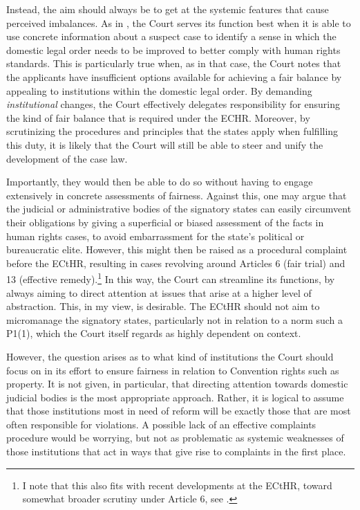 Instead, the aim should always be to get at the systemic features that cause perceived imbalances. As in \textcite{hutten06}, the Court serves its function best when it is able to use concrete information about a suspect case to identify a sense in which the domestic legal order needs to be improved to better comply with human rights standards. This is particularly true when, as in that case, the Court notes that the applicants have insufficient options available for achieving a fair balance by appealing to institutions within the domestic legal order. By demanding {\it institutional} changes, the Court effectively delegates responsibility for ensuring the kind of fair balance that is required under the ECHR. Moreover, by scrutinizing the procedures and principles that the states apply when fulfilling this duty, it is likely that the Court will still be able to steer and unify the development of the case law. 

Importantly, they would then be able to do so without having to engage extensively in concrete assessments of fairness. Against this, one may argue that the judicial or administrative bodies of the signatory states can easily circumvent their obligations by giving a superficial or biased assessment of the facts in human rights cases, to avoid embarrassment for the state's political or bureaucratic elite. However, this might then be raised as a procedural complaint before the ECtHR, resulting in cases revolving around Articles 6 (fair trial) and 13 (effective remedy).\footnote{I note that this also fits with recent developments at the ECtHR, toward somewhat broader scrutiny under Article 6, see \cite{khamidov07}.}  In this way, the Court can streamline its functions, by always aiming to direct attention at issues that arise at a higher level of abstraction. This, in my view, is desirable. The ECtHR should not aim to micromanage the signatory states, particularly not in relation to a norm such a P1(1), which the Court itself regards as highly dependent on context.

However, the question arises as to what kind of institutions the Court should focus on in its effort to ensure fairness in relation to Convention rights such as property. It is not given, in particular, that directing attention towards domestic judicial bodies is the most appropriate approach. Rather, it is logical to assume that those institutions most in need of reform will be exactly those that are most often responsible for violations. A possible lack of an effective complaints procedure would be worrying, but not as problematic as systemic weaknesses of those institutions that act in ways that give rise to complaints in the first place. 


